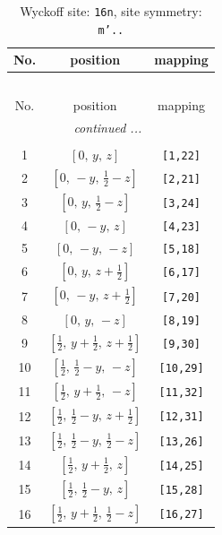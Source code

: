 \documentclass[fleqn,8pt]{jsarticle}
\begin{document}
\renewcommand{\arraystretch}{1.2}
\begin{longtable}{ccc}
\caption{Wyckoff site: {\tt 16n}, site symmetry: {\tt m'..}}
 \\
 \hline \hline
No. & position & mapping \\ \hline \endfirsthead

\multicolumn{2}{l}{\tablename\ \thetable{}} \\
 \hline \hline
No. & position & mapping \\ \hline \endhead

 \hline \hline
\multicolumn{2}{r}{\footnotesize\it continued ...} \\ \endfoot

 \hline \hline
\multicolumn{2}{r}{} \\ \endlastfoot

1 & $\left[ 0,\, y,\, z \right]$ & {\tt [1,22]} \\ \hline
2 & $\left[ 0,\, - y,\, \frac{1}{2} - z \right]$ & {\tt [2,21]} \\ \hline
3 & $\left[ 0,\, y,\, \frac{1}{2} - z \right]$ & {\tt [3,24]} \\ \hline
4 & $\left[ 0,\, - y,\, z \right]$ & {\tt [4,23]} \\ \hline
5 & $\left[ 0,\, - y,\, - z \right]$ & {\tt [5,18]} \\ \hline
6 & $\left[ 0,\, y,\, z + \frac{1}{2} \right]$ & {\tt [6,17]} \\ \hline
7 & $\left[ 0,\, - y,\, z + \frac{1}{2} \right]$ & {\tt [7,20]} \\ \hline
8 & $\left[ 0,\, y,\, - z \right]$ & {\tt [8,19]} \\ \hline
9 & $\left[ \frac{1}{2},\, y + \frac{1}{2},\, z + \frac{1}{2} \right]$ & {\tt [9,30]} \\ \hline
10 & $\left[ \frac{1}{2},\, \frac{1}{2} - y,\, - z \right]$ & {\tt [10,29]} \\ \hline
11 & $\left[ \frac{1}{2},\, y + \frac{1}{2},\, - z \right]$ & {\tt [11,32]} \\ \hline
12 & $\left[ \frac{1}{2},\, \frac{1}{2} - y,\, z + \frac{1}{2} \right]$ & {\tt [12,31]} \\ \hline
13 & $\left[ \frac{1}{2},\, \frac{1}{2} - y,\, \frac{1}{2} - z \right]$ & {\tt [13,26]} \\ \hline
14 & $\left[ \frac{1}{2},\, y + \frac{1}{2},\, z \right]$ & {\tt [14,25]} \\ \hline
15 & $\left[ \frac{1}{2},\, \frac{1}{2} - y,\, z \right]$ & {\tt [15,28]} \\ \hline
16 & $\left[ \frac{1}{2},\, y + \frac{1}{2},\, \frac{1}{2} - z \right]$ & {\tt [16,27]} \\
\end{longtable}
\end{document}
